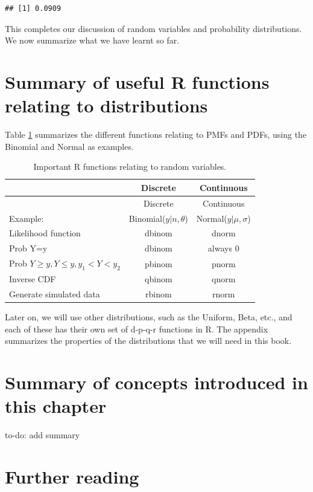 \documentclass[12pt,]{krantz}
\makeatletter
\newenvironment{kframe}{%
\medskip{}
\setlength{\fboxsep}{.8em}
 \def\at@end@of@kframe{}%
 \ifinner\ifhmode%
  \def\at@end@of@kframe{\end{minipage}}%
  \begin{minipage}{\columnwidth}%
 \fi\fi%
 \def\FrameCommand##1{\hskip\@totalleftmargin \hskip-\fboxsep
 \colorbox{shadecolor}{##1}\hskip-\fboxsep
     \hskip-\linewidth \hskip-\@totalleftmargin \hskip\columnwidth}%
 \MakeFramed {\advance\hsize-\width
   \@totalleftmargin\z@ \linewidth\hsize
   \@setminipage}}%
 {\par\unskip\endMakeFramed%
 \at@end@of@kframe}
\newenvironment{rmdblock}[1]
  {
  \begin{itemize}
  \renewcommand{\labelitemi}{
    \raisebox{-.7\height}[0pt][0pt]{
      {\setkeys{Gin}{width=3em,keepaspectratio}\texttt{[image: images/\#1]}}
    }
  }
  \setlength{\fboxsep}{1em}
  \begin{kframe}
  \item
  }
  {
  \end{kframe}
  \end{itemize}
  }
\newenvironment{rmdnote}
  {\begin{rmdblock}{note}}
  {\end{rmdblock}}
\theoremstyle{definition}
\theoremstyle{definition}
\theoremstyle{definition}
\theoremstyle{remark}
\makeatother
\begin{document}
\begin{verbatim}
## [1] 0.0909
\end{verbatim}

This completes our discussion of random variables and probability distributions. We now summarize what we have learnt so far.

\hypertarget{summary-of-useful-r-functions-relating-to-distributions}{%
\section{Summary of useful R functions relating to distributions}\label{summary-of-useful-r-functions-relating-to-distributions}}

Table \ref{tab:dpqrfunctions} summarizes the different functions relating to PMFs and PDFs, using the Binomial and Normal as examples.

\begin{longtable}[]{@{}lcc@{}}
\caption{\label{tab:dpqrfunctions} Important R functions relating to random variables.}\tabularnewline
\toprule
& Discrete & Continuous\tabularnewline
\midrule
\endfirsthead
\toprule
& Discrete & Continuous\tabularnewline
\midrule
\endhead
Example: & Binomial(\(y|n,\theta\)) & Normal(\(y|\mu,\sigma\))\tabularnewline
Likelihood function & dbinom & dnorm\tabularnewline
Prob Y=y & dbinom & always 0\tabularnewline
Prob \(Y\geq y, Y\leq y, y_1<Y<y_2\) & pbinom & pnorm\tabularnewline
Inverse CDF & qbinom & qnorm\tabularnewline
Generate simulated data & rbinom & rnorm\tabularnewline
\bottomrule
\end{longtable}

Later on, we will use other distributions, such as the Uniform, Beta, etc., and each of these has their own set of d-p-q-r functions in R. The appendix summarizes the properties of the distributions that we will need in this book.

\hypertarget{summary-of-concepts-introduced-in-this-chapter}{%
\section{Summary of concepts introduced in this chapter}\label{summary-of-concepts-introduced-in-this-chapter}}

\begin{rmdnote}
to-do: add summary
\end{rmdnote}

\hypertarget{further-reading}{%
\section{Further reading}\label{further-reading}}
\end{document}
